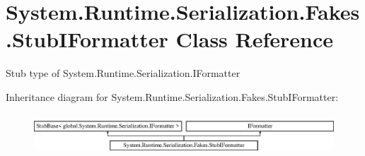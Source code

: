 \hypertarget{class_system_1_1_runtime_1_1_serialization_1_1_fakes_1_1_stub_i_formatter}{\section{System.\-Runtime.\-Serialization.\-Fakes.\-Stub\-I\-Formatter Class Reference}
\label{class_system_1_1_runtime_1_1_serialization_1_1_fakes_1_1_stub_i_formatter}
}


Stub type of System.\-Runtime.\-Serialization.\-I\-Formatter 


Inheritance diagram for System.\-Runtime.\-Serialization.\-Fakes.\-Stub\-I\-Formatter\-:\begin{figure}[H]
\begin{center}
\leavevmode
\includegraphics[height=1.568627cm]{class_system_1_1_runtime_1_1_serialization_1_1_fakes_1_1_stub_i_formatter}
\end{center}
\end{figure}
